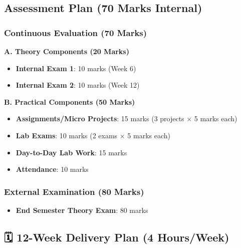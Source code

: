 \documentclass[
  letterpaper,
  DIV=11,
  numbers=noendperiod]{scrreprt}
\providecommand{\tightlist}{%
  \setlength{\itemsep}{0pt}\setlength{\parskip}{0pt}}
\begin{document}
\subsection*{Assessment Plan (70 Marks
Internal)}\label{assessment-plan-70-marks-internal}

\subsubsection*{Continuous Evaluation (70
Marks)}\label{continuous-evaluation-70-marks}

\textbf{A. Theory Components (20 Marks)}

\begin{itemize}
\tightlist
\item
  \textbf{Internal Exam 1}: 10 marks (Week 6)
\item
  \textbf{Internal Exam 2}: 10 marks (Week 12)
\end{itemize}

\textbf{B. Practical Components (50 Marks)}

\begin{itemize}
\tightlist
\item
  \textbf{Assignments/Micro Projects}: 15 marks (3 projects × 5 marks
  each)
\item
  \textbf{Lab Exams}: 10 marks (2 exams × 5 marks each)
\item
  \textbf{Day-to-Day Lab Work}: 15 marks
\item
  \textbf{Attendance}: 10 marks
\end{itemize}

\subsubsection*{External Examination (80
Marks)}\label{external-examination-80-marks}

\begin{itemize}
\tightlist
\item
  \textbf{End Semester Theory Exam}: 80 marks
\end{itemize}

\subsection*{🗓️ 12-Week Delivery Plan (4
Hours/Week)}\label{week-delivery-plan-4-hoursweek}
\end{document}
